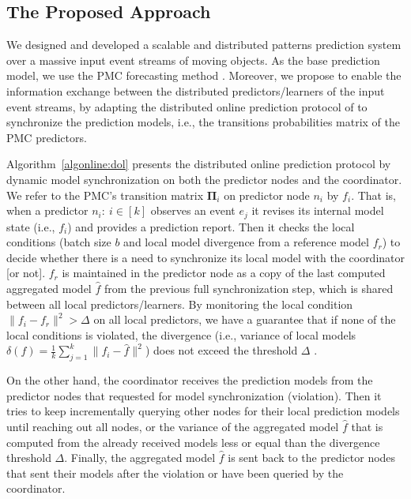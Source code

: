 \subsection{The Proposed Approach}
\label{sec:proposed_approach}
\par We designed and developed a scalable and distributed patterns prediction system over a massive input event streams of moving objects. As the base prediction model, we use the PMC forecasting method \cite{alevizos2017event}. Moreover,  we propose to enable the information exchange between the distributed predictors/learners of the input event streams, by adapting the distributed online prediction protocol of \cite{kamp2014communication} to synchronize the prediction models, i.e., the transitions probabilities matrix of the PMC predictors.

\par Algorithm~\ref{algonline:dol} presents the distributed online prediction protocol by dynamic model synchronization on both the predictor nodes and the coordinator. We refer to the PMC's transition matrix $\boldsymbol{\Pi}_i$ on predictor node $n_i$ by $f_i$. That is, when a predictor $n_i:\ i \in[k]$ observes an event $e_j$ it revises its internal model state (i.e., $f_i$) and provides a prediction report. Then it checks the local conditions  (batch size $b$ and local model divergence from a reference model $f_r$) to decide whether there is a need to synchronize its local model with the coordinator [or not].  $f_r$ is maintained in the predictor node as a copy of the last computed aggregated model $\hat{f}$ from the previous full synchronization step, which is shared between all local predictors/learners. By monitoring the local condition $\|f_i - f_r\|^2 > \Delta$ on all local predictors, we have a guarantee that if none of the local conditions is violated, the divergence (i.e., variance of local models $\delta(f)=\frac{1}{k} \sum_{j=1}^{k}\|f_i - \hat{f}\|^2$) does not exceed the threshold $\Delta$ \cite{kamp2014communication}. 

\par On the other hand, the coordinator receives the prediction models from the predictor nodes that requested for model synchronization (violation). Then it tries to keep incrementally querying other nodes for their local prediction models until reaching out all nodes, or the variance of the aggregated model $\hat{f}$ that is computed from the already received models less or equal than the divergence threshold  $\Delta$. Finally, the aggregated model $\hat{f}$ is sent back to the predictor nodes that sent their models after the violation or have been queried by the coordinator.

